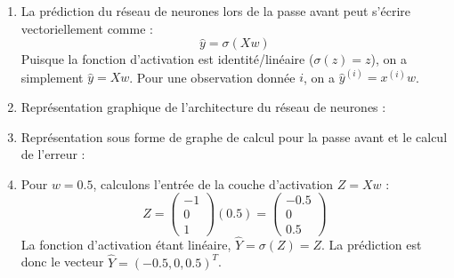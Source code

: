 \documentclass[]{../exercices}
\begin{document}
\begin{solution}
\begin{enumerate}
    \item La prédiction du réseau de neurones lors de la passe avant peut s'écrire vectoriellement comme :
    \begin{equation*}
        \hat{y} = \sigma(X w)
    \end{equation*}
    Puisque la fonction d'activation est identité/linéaire ($\sigma(z) = z$), on a simplement $\hat{y} = X w$. Pour une observation donnée $i$, on a $\hat{y}^{(i)} = x^{(i)} w$.

    \item Représentation graphique de l'architecture du réseau de neurones :
    \begin{center}
    \end{center}

    \item Représentation sous forme de graphe de calcul pour la passe avant et le calcul de l'erreur :
    \begin{center}
    \end{center}

    \item Pour $w = 0.5$, calculons l'entrée de la couche d'activation $Z = X w$ :
    \begin{equation*}
        Z = \begin{pmatrix} -1 \\ 0 \\ 1 \end{pmatrix} (0.5) = \begin{pmatrix} -0.5 \\ 0 \\ 0.5 \end{pmatrix}
    \end{equation*}
    La fonction d'activation étant linéaire, $\hat{Y} = \sigma(Z) = Z$. La prédiction est donc le vecteur $\hat{Y} = (-0.5, 0, 0.5)^T$.


\end{enumerate}
\end{solution}
\end{document}
